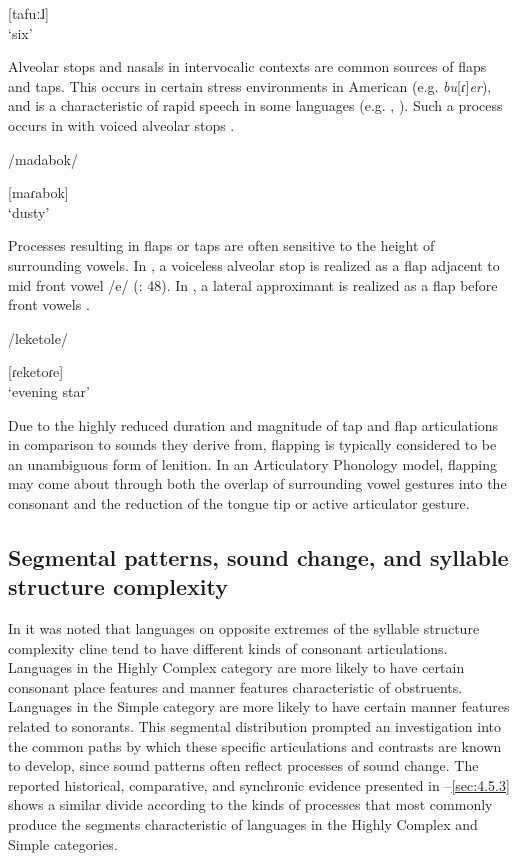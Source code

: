 [tafuːɺ]\\
\glt ‘six’
\citep[45]{Braine1970}
\z

  Alveolar stops and nasals in intervocalic contexts are common sources of flaps and taps. This occurs in certain stress environments in American  (e.g. \textit{bu}[ɾ]\textit{er}), and is a characteristic of rapid speech in some languages (e.g. , \citealt{Sandalo1997}). Such a process occurs in  with voiced alveolar stops .

\ea\label{ex:4.54}

/madabok/

[maɾabok]\\
\glt ‘dusty’
\citep[18]{Benton1971}
\z

  Processes resulting in flaps or taps are often sensitive to the height of surrounding vowels. In , a voiceless alveolar stop is realized as a flap adjacent to mid front vowel /e/ (\citealt{CunhadeOliveira2005}: 48). In , a lateral approximant is realized as a flap before front vowels .

\ea\label{ex:4.55}

/leketole/

[ɾeketoɾe]\\
\glt ‘evening star’
\citep[6]{Dutton1996}
\z

  Due to the highly reduced duration and magnitude of tap and flap articulations in comparison to sounds they derive from, flapping is typically considered to be an unambiguous form of lenition. In an Articulatory Phonology model, flapping may come about through both the overlap of surrounding vowel gestures into the consonant and the reduction of the tongue tip or active articulator gesture. 

\subsection{Segmental patterns, sound change, and syllable structure complexity}\label{sec:4.5.4}

  In  it was noted that languages on opposite extremes of the syllable structure complexity cline tend to have different kinds of consonant articulations. Languages in the Highly Complex category are more likely to have certain consonant place features and manner features characteristic of obstruents. Languages in the Simple category are more likely to have certain manner features related to sonorants. This segmental distribution prompted an investigation into the common paths by which these specific articulations and contrasts are known to develop, since sound patterns often reflect processes of sound change. The reported historical, comparative, and synchronic evidence presented in --\ref{sec:4.5.3} shows a similar divide according to the kinds of processes that most commonly produce the segments characteristic of languages in the Highly Complex and Simple categories.

